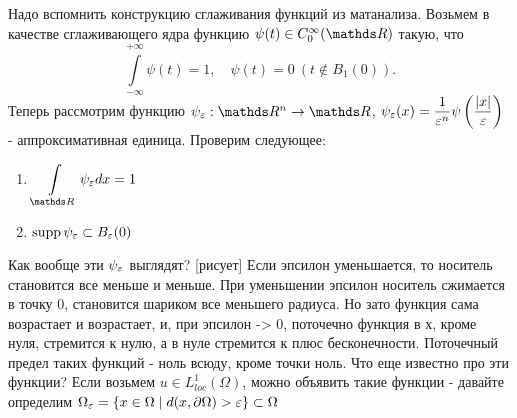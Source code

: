 Надо вспомнить конструкцию сглаживания функций из матанализа. 
Возьмем в качестве сглаживающего ядра функцию $\psi(t) \in C_0^{\infty}(\real)$ такую, что 
$$\int \limits_{-\infty}^{+\infty} \psi(t) = 1, \quad \psi(t) = 0 \ (t \notin B_1(0)).$$
Теперь рассмотрим функцию $\psi_{\eps} : \real^n \rightarrow \real$, $\psi_{\varepsilon}(x) = \displaystyle \frac{1}{\varepsilon^n}\psi \left(\frac{\lvert x\rvert}{\varepsilon}\right)$ - аппроксимативная единица.
Проверим следующее:
\begin{enumerate}
\item $\dsint \limits_{\real} \psi_{\eps} dx = 1$
\item $\operatorname{supp} \psi_{\varepsilon} \subset B_{\varepsilon}(0)$
\end{enumerate}

Как вообще эти $\psi_{\varepsilon}$ выглядят? [рисует] Если эпсилон уменьшается, то носитель становится все меньше и меньше. При уменьшении эпсилон носитель сжимается в точку 0, становится шариком все меньшего радиуса. Но зато функция сама возрастает и возрастает, и, при эпсилон -> 0, поточечно функция в х, кроме нуля, стремится к нулю, а в нуле стремится к плюс бесконечности. Поточечный предел таких функций - ноль всюду, кроме точки ноль. Что еще известно про эти функции? Если возьмем $u \in L_{loc}^1(\Omega)$, можно объявить такие функции - давайте определим $\Omega_{\varepsilon} = \{ x \in \Omega \mid d(x, \partial\Omega) > \varepsilon \} \subset \Omega$ 

